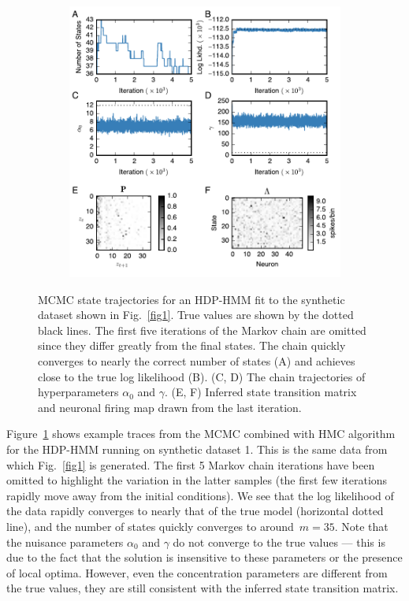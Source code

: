  
\begin{figure}
  \centering
  \begin{subfigure}[t]{5in}
    \includegraphics[width=\textwidth]{figures/ch5/Fig2}
  \end{subfigure}
  \caption{MCMC state trajectories for an HDP-HMM fit to the synthetic dataset shown in Fig.~\ref{fig1}. True values are shown by the dotted black lines. The first five iterations of the Markov chain are omitted since they differ greatly from the final states. The chain quickly converges to nearly the correct number of states (A) and achieves close to the true log likelihood (B). (C, D) The chain trajectories of hyperparameters $\alpha_0$ and $\gamma$. (E, F) Inferred state transition matrix and neuronal firing map drawn from the last iteration.  }
  \label{fig2}
\end{figure}

Figure~\ref{fig2} shows example traces from the MCMC combined with HMC algorithm for the HDP-HMM running on synthetic dataset 1. This is the same data from which Fig.~\ref{fig1} is generated. The first 5 Markov chain iterations have been omitted to highlight the variation in the latter samples (the first few iterations rapidly move away from the initial conditions). We see that the log likelihood of the data rapidly converges to nearly that of the true model (horizontal dotted line), and the number of states quickly converges to around~$m=35$.  Note that the nuisance parameters $\alpha_0$  and $\gamma$ do not converge to the true values --- this is due to the fact that the solution is insensitive to these parameters or the presence of local optima.  However, even the concentration parameters are different from the true values,  they are still consistent with the inferred state transition matrix. 

